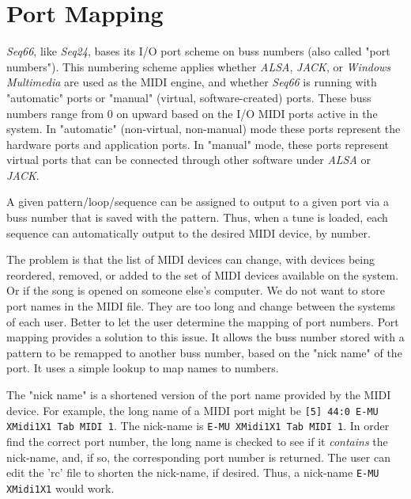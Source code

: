 %
%
%

\section{Port Mapping}
\label{sec:port_mapping}

   \textsl{Seq66}, like \textsl{Seq24}, bases its I/O port scheme on buss
   numbers (also called "port numbers").  This numbering scheme applies whether
   \textsl{ALSA}, \textsl{JACK}, or \textsl{Windows Multimedia}
   are used as the MIDI engine, and whether \textsl{Seq66} is running with
   "automatic" ports or "manual" (virtual, software-created) ports.
   These buss numbers range from 0 on upward
   based on the I/O MIDI ports active in the system.
   In "automatic" (non-virtual, non-manual) mode
   these ports represent the hardware ports and application ports.
   In "manual" mode, these ports represent virtual ports
   that can be connected through other software under \textsl{ALSA} or
   \textsl{JACK}.

   A given pattern/loop/sequence can be assigned to output to a given port via
   a buss number that is saved with the pattern.  Thus, when a tune is loaded,
   each sequence can automatically output to the desired MIDI device, by number.

   The problem is that the list of MIDI devices can change, with devices being
   reordered, removed, or added to the set of MIDI devices available on the
   system.  Or if the song is opened on someone else's computer.
   We do not want to store port names in the MIDI file.
   They are too long and change between the systems of each user.
   Better to let the user determine the mapping of port numbers.
   Port mapping provides a solution to this issue.  It allows
   the buss number stored with a pattern to be remapped to another buss number,
   based on the "nick name" of the port.
   It uses a simple lookup to map names to numbers.

   The "nick name" is a shortened version of the port name provided by the MIDI
   device. For example, the long name of a MIDI port might be
   \texttt{[5] 44:0 E-MU XMidi1X1 Tab MIDI 1}.
   The nick-name is \texttt{E-MU XMidi1X1 Tab MIDI 1}.
   In order find the correct port number, the long name is checked to see if it
   \textsl{contains} the nick-name, and, if so, the corresponding port number is
   returned.  The user can edit the 'rc' file to shorten the nick-name, if
   desired.
   Thus, a nick-name \texttt{E-MU XMidi1X1} would work.

